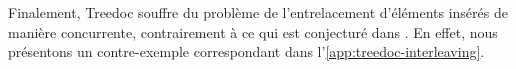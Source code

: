 Finalement, Treedoc souffre du problème de l'entrelacement d'éléments insérés de manière concurrente, contrairement à ce qui est conjecturé dans \cite{2019-interleaving-anomalies-collaborative-editors-kleppmann}.
En effet, nous présentons un contre-exemple correspondant dans l'\autoref{app:treedoc-interleaving}.
